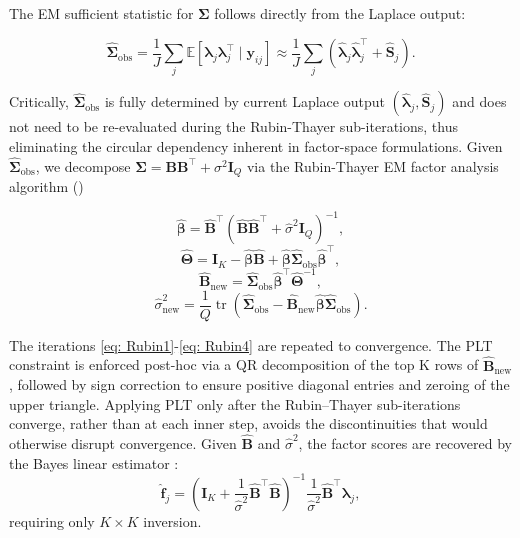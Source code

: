 The EM sufficient statistic for $\bm{\Sigma}$ follows directly from the Laplace output:

\begin{equation}
    \hat{\bm{\Sigma}}_{\text{obs}}=\frac{1}{J}\sum_{j}\mathbb{E}[\bm{\lambda}_{j} \bm{\lambda}_{j}^{\top}\mid \bm{y}_{ij}]\approx \frac{1}{J}\sum_{j}(\hat{\bm{\lambda}}_{j} \hat{\bm{\lambda}}_{j}^{\top}+\hat{\mathbf{S}}_{j}).
    \label{eq:sigma-obs}
\end{equation}

Critically, $\hat{\bm{\Sigma}}_{\text{obs}}$ is fully determined by current Laplace output $(\hat{\bm{\lambda}}_{j}, \hat{\mathbf{S}}_{j})$ and does not need to be re-evaluated during the Rubin-Thayer sub-iterations, thus eliminating the circular dependency inherent in factor-space formulations.
Given $\hat{\bm{\Sigma}}_{\text{obs}}$, we decompose $\bm{\Sigma}=\mathbf{BB}^{\top}+\sigma^2\mathbf{I}_{Q}$ via the Rubin-Thayer EM factor analysis algorithm (\citet{Rubin1982})

\begin{equation}
\hat{\boldsymbol{\beta}}
=
\hat{\mathbf{B}}^\top
\left(
\hat{\mathbf{B}}\hat{\mathbf{B}}^\top
+
\hat{\sigma}^2 \mathbf{I}_Q
\right)^{-1},
\label{eq: Rubin1}
\end{equation}
\begin{equation}
\hat{\boldsymbol{\Theta}}
=
\mathbf{I}_{K}
-
\hat{\boldsymbol{\beta}}\hat{\mathbf{B}}
+
\hat{\boldsymbol{\beta}}
\hat{\boldsymbol{\Sigma}}_{\mathrm{obs}}
\hat{\boldsymbol{\beta}}^\top,
\label{eq: Rubin2}
\end{equation}
\begin{equation}
\hat{\mathbf{B}}_{\mathrm{new}}
=
\hat{\boldsymbol{\Sigma}}_{\mathrm{obs}}
\hat{\boldsymbol{\beta}}^\top
\hat{\boldsymbol{\Theta}}^{-1},
\label{eq: Rubin3}
\end{equation}
\begin{equation}
\hat{\sigma}_{\mathrm{new}}^{2}
=
\frac{1}{Q}
\operatorname{tr}
\left(
\hat{\boldsymbol{\Sigma}}_{\mathrm{obs}}
-
\hat{\mathbf{B}}_{\mathrm{new}}
\hat{\boldsymbol{\beta}}
\hat{\boldsymbol{\Sigma}}_{\mathrm{obs}}
\right).
\label{eq: Rubin4}
\end{equation}

The iterations  \eqref{eq: Rubin1}-\eqref{eq: Rubin4} are repeated to convergence. The PLT constraint is enforced post-hoc via a QR decomposition of the top K rows of $\hat{\mathbf{B}}_{\text{new}}$, followed by sign correction to ensure positive diagonal entries and zeroing of the upper triangle. Applying PLT only after the Rubin–Thayer sub-iterations converge, rather than at each inner step, avoids the discontinuities that would otherwise disrupt convergence.
    Given $\hat{\mathbf{B}}$ and $\hat{\sigma}^2$, the factor scores are recovered by the Bayes linear estimator \citep{Gelman2013}:
\begin{equation}
\hat{\mathbf{f}}_j = \left( \mathbf{I}_K + \frac{1}{\hat{\sigma}^2} \hat{\mathbf{B}}^\top \hat{\mathbf{B}} \right)^{-1} \frac{1}{\hat{\sigma}^2} \hat{\mathbf{B}}^\top \hat{\boldsymbol{\lambda}}_j ,
\label{eq: Bayeslinearestimator}
\end{equation}
requiring only $K\times K$ inversion.

